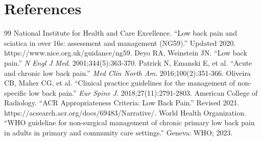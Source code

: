 \section*{References}
\begin{thebibliography}{99}
 National Institute for Health and Care Excellence. ``Low back pain and sciatica in over 16s: assessment and management (NG59).'' Updated 2020. https://www.nice.org.uk/guidance/ng59.
 Deyo RA, Weinstein JN. ``Low back pain.'' \textit{N Engl J Med}. 2001;344(5):363-370.
 Patrick N, Emanski E, et al. ``Acute and chronic low back pain.'' \textit{Med Clin North Am}. 2016;100(2):351-366.
 Oliveira CB, Maher CG, et al. ``Clinical practice guidelines for the management of non-specific low back pain.'' \textit{Eur Spine J}. 2018;27(11):2791-2803.
 American College of Radiology. ``ACR Appropriateness Criteria: Low Back Pain.'' Revised 2021. https://acsearch.acr.org/docs/69483/Narrative/.
 World Health Organization. ``WHO guideline for non-surgical management of chronic primary low back pain in adults in primary and community care settings.'' Geneva: WHO; 2023.
\end{thebibliography}
